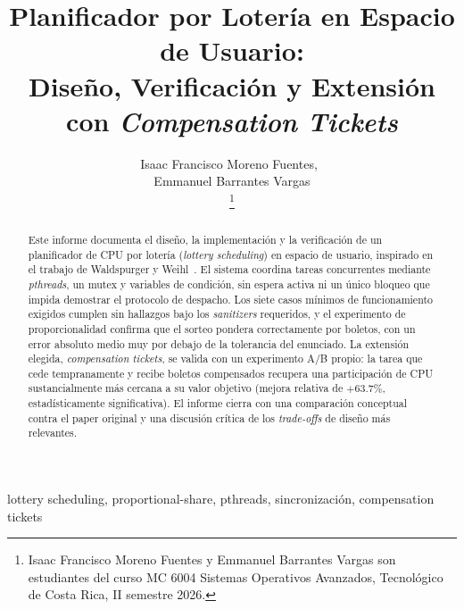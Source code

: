 \documentclass[journal]{IEEEtran}
\title{Planificador por Lotería en Espacio de Usuario:\\
Diseño, Verificación y Extensión con \textit{Compensation Tickets}}
\author{
    Isaac Francisco Moreno Fuentes,~\\
    Emmanuel Barrantes Vargas\\
    \thanks{Isaac Francisco Moreno Fuentes y Emmanuel Barrantes Vargas son estudiantes del curso MC 6004 Sistemas Operativos Avanzados, Tecnológico de Costa Rica, II semestre 2026.}
}
\begin{document}
\maketitle

\begin{abstract}
Este informe documenta el diseño, la implementación y la verificación de un
planificador de CPU por lotería (\textit{lottery scheduling}) en espacio de
usuario, inspirado en el trabajo de Waldspurger y Weihl~\cite{Waldspurger1994}.
El sistema coordina tareas concurrentes mediante \textit{pthreads}, un mutex
y variables de condición, sin espera activa ni un único bloqueo que impida
demostrar el protocolo de despacho. Los siete casos mínimos de
funcionamiento exigidos cumplen sin hallazgos bajo los \textit{sanitizers}
requeridos, y el experimento de proporcionalidad confirma que el sorteo
pondera correctamente por boletos, con un error absoluto medio muy por
debajo de la tolerancia del enunciado. La extensión elegida,
\textit{compensation tickets}, se valida con un experimento A/B propio: la
tarea que cede tempranamente y recibe boletos compensados recupera una
participación de CPU sustancialmente más cercana a su valor objetivo
(mejora relativa de $+63.7\%$, estadísticamente significativa). El informe
cierra con una comparación conceptual contra el paper original y una
discusión crítica de los \textit{trade-offs} de diseño más relevantes.
\end{abstract}

\begin{IEEEkeywords}
lottery scheduling, proportional-share, pthreads, sincronización, compensation tickets
\end{IEEEkeywords}














\end{document}
